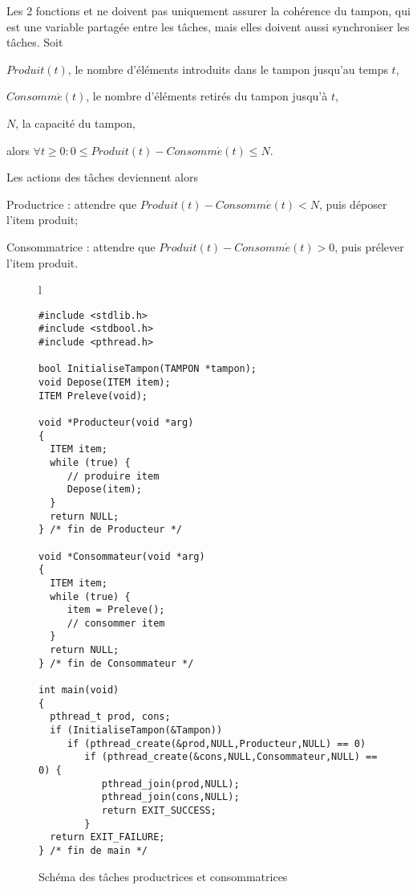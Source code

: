 Les 2 fonctions  et  ne doivent pas uniquement assurer la cohérence du tampon, qui est une variable partagée entre les tâches, mais elles doivent aussi synchroniser les tâches. Soit

\hspace{0.6cm}$Produit(t)$, le nombre d'éléments introduits dans le tampon jusqu'au temps $t$,

\hspace{0.6cm}$Consomm\acute{e}(t)$, le nombre d'éléments retirés du tampon jusqu'à $t$,

\hspace{0.6cm}$N$, la capacité du tampon,

alors $\forall t \geq 0: 0 \leq Produit(t) - Consomm\acute{e}(t) \leq N$.

Les actions des tâches deviennent alors

\hspace{0.6cm}Productrice : attendre que $Produit(t) - Consomm\acute{e}(t) < N$, puis déposer l'item produit;

\hspace{0.6cm}Consommatrice : attendre que $Produit(t) - Consomm\acute{e}(t) > 0$, puis prélever l'item produit.

\begin{figure}[t]

\centering
\begin{tabular}{l}
\lstset{language=C++}
\begin{lstlisting}
#include <stdlib.h>
#include <stdbool.h>
#include <pthread.h>

bool InitialiseTampon(TAMPON *tampon);
void Depose(ITEM item);
ITEM Preleve(void);

void *Producteur(void *arg)
{
  ITEM item;
  while (true) {
     // produire item
     Depose(item);
  }
  return NULL;
} /* fin de Producteur */

void *Consommateur(void *arg)
{
  ITEM item;
  while (true) {
     item = Preleve();
     // consommer item
  }
  return NULL;
} /* fin de Consommateur */

int main(void)
{
  pthread_t prod, cons;
  if (InitialiseTampon(&Tampon))
     if (pthread_create(&prod,NULL,Producteur,NULL) == 0)
        if (pthread_create(&cons,NULL,Consommateur,NULL) == 0) {
           pthread_join(prod,NULL);
           pthread_join(cons,NULL);
           return EXIT_SUCCESS;
        }
  return EXIT_FAILURE;
} /* fin de main */
\end{lstlisting}
\end{tabular}
\caption{\label{prodcons:base}Schéma des tâches productrices et consommatrices}

\end{figure}

